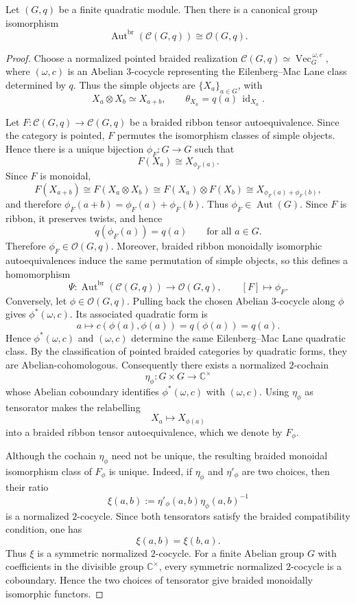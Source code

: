 \documentclass[10pt,a4paper]{amsart}
\begin{document}
\begin{theorem}
\label{thm:Eq-O}
Let $(G,q)$ be a finite quadratic module. Then there is a canonical group isomorphism
$$
\operatorname{Aut}^{\mathrm{br}}(\mathcal C(G,q))\cong \mathcal O(G,q).
$$
\end{theorem}

\begin{proof}
Choose a normalized pointed braided realization $
\mathcal C(G,q)\simeq \operatorname{Vec}^{\,\omega,c}_G,$ where $(\omega,c)$ is an Abelian $3$-cocycle representing the
Eilenberg--Mac Lane class determined by $q$. Thus the simple objects
are $\{X_a\}_{a\in G}$, with
$$
X_a\otimes X_b\simeq X_{a+b},
\qquad
\theta_{X_a}=q(a)\,\operatorname{id}_{X_a}.
$$

Let $F:\mathcal C(G,q)\rightarrow\mathcal C(G,q)$ be a braided ribbon tensor autoequivalence. Since the category is pointed, $F$ permutes the isomorphism classes of simple objects. Hence there is a unique bijection $\phi_F:G\to G$ such that
$$
F(X_a)\cong X_{\phi_F(a)}.
$$
Since $F$ is monoidal,
$$
F(X_{a+b})
\cong
F(X_a\otimes X_b)
\cong
F(X_a)\otimes F(X_b)
\cong
X_{\phi_F(a)+\phi_F(b)},
$$
and therefore $\phi_F(a+b)=\phi_F(a)+\phi_F(b).$ Thus $\phi_F\in\operatorname{Aut}(G)$. Since $F$ is ribbon, it preserves twists, and hence
$$
q(\phi_F(a))=q(a)\qquad \text{for all }a\in G.
$$
Therefore $\phi_F\in\mathcal O(G,q)$. Moreover, braided ribbon
monoidally isomorphic autoequivalences induce the same permutation of
simple objects, so this defines a homomorphism
$$
\Psi:
\operatorname{Aut}^{\mathrm{br}}(\mathcal C(G,q))
\longrightarrow
\mathcal O(G,q),
\qquad
[F]\longmapsto\phi_F.
$$
Conversely, let $\phi\in\mathcal O(G,q)$. Pulling back the chosen Abelian $3$-cocycle along $\phi$ gives $\phi^*(\omega,c).$ Its associated quadratic form is
$$
a\longmapsto c(\phi(a),\phi(a))
=q(\phi(a))
=q(a).
$$
Hence $\phi^*(\omega,c)$ and $(\omega,c)$ determine the same Eilenberg--Mac Lane quadratic class. By the classification of pointed braided categories by quadratic forms, they are Abelian-cohomologous. Consequently there exists a normalized $2$-cochain
$$
\eta_\phi:G\times G\longrightarrow\mathbb C^\times
$$
whose Abelian coboundary identifies $\phi^*(\omega,c)$ with $(\omega,c)$. Using $\eta_\phi$ as tensorator makes the relabelling
$$
X_a\longmapsto X_{\phi(a)}
$$
into a braided ribbon tensor autoequivalence, which we denote by $F_\phi$.

Although the cochain $\eta_\phi$ need not be unique, the resulting braided monoidal isomorphism class of $F_\phi$ is unique. Indeed, if $\eta_\phi$ and $\eta'_\phi$ are two choices, then their ratio
$$
\xi(a,b):=\eta'_\phi(a,b)\eta_\phi(a,b)^{-1}
$$
is a normalized $2$-cocycle. Since both tensorators satisfy the braided compatibility condition, one has
$$
\xi(a,b)=\xi(b,a).
$$
Thus $\xi$ is a symmetric normalized $2$-cocycle. For a finite Abelian group $G$ with coefficients in the divisible group $\mathbb C^\times$, every symmetric normalized $2$-cocycle is a coboundary. Hence the two choices of tensorator give braided monoidally isomorphic functors.


\end{proof}
\end{document}
